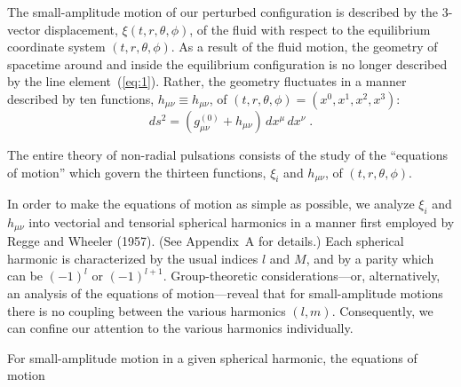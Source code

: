 The small-amplitude motion of our perturbed configuration is described by the 3-vector
displacement, $\xi(t, r, \theta, \phi)$, of the fluid with respect to the equilibrium coordinate system $(t, r, \theta, \phi)$.
As a result of the fluid motion, the geometry of spacetime around and inside the equilibrium configuration is no longer described by the line element~(\ref{eq:1}). Rather, the
geometry fluctuates in a manner described by ten functions, $h_{\mu\nu} \equiv h_{\mu\nu}$, of $(t, r, \theta, \phi) = (x^0, x^1, x^2, x^3)$:
\begin{equation}
  ds^2 = (g_{\mu\nu}^{(0)} + h_{\mu\nu})\,dx^\mu\,dx^\nu \;.
\label{eq:5}
\end{equation}

The entire theory of non-radial pulsations consists of the study of the ``equations of
motion'' which govern the thirteen functions, $\xi_i$ and $h_{\mu\nu}$, of $(t, r, \theta, \phi)$.

In order to make the equations of motion as simple as possible, we analyze $\xi_i$ and
$h_{\mu\nu}$ into vectorial and tensorial spherical harmonics in a manner first employed by Regge
and Wheeler (1957). (See Appendix~A for details.) Each spherical harmonic is characterized
by the usual indices $l$ and $M$, and by a parity which can be $(-1)^l$ or
$(-1)^{l+1}$. Group-theoretic considerations---or, alternatively, an analysis of the equations
of motion---reveal that for small-amplitude motions there is no coupling between the
various harmonics $(l, m)$. Consequently, we can confine our attention to the various harmonics individually.

For small-amplitude motion in a given spherical harmonic, the equations of motion
